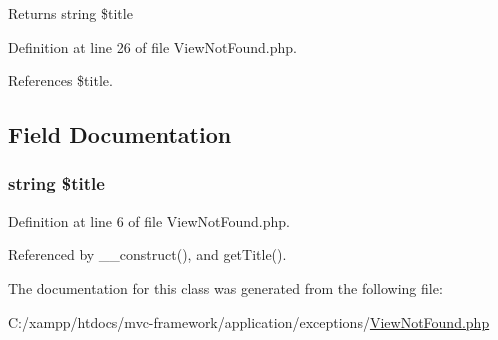 \begin{DoxyReturn}{Returns}
string \$title 
\end{DoxyReturn}


Definition at line 26 of file View\+Not\+Found.\+php.



References \$title.




\subsection{Field Documentation}
\hypertarget{class_view_not_found_a5ef02115477cfad473df2455da5a908e}{}
\subsubsection[{\$title}]{\setlength{\rightskip}{0pt plus 5cm}string \$title\hspace{0.3cm}{\ttfamily [protected]}}\label{class_view_not_found_a5ef02115477cfad473df2455da5a908e}


Definition at line 6 of file View\+Not\+Found.\+php.



Referenced by \+\_\+\+\_\+construct(), and get\+Title().



The documentation for this class was generated from the following file\+:\begin{DoxyCompactItemize}
\item 
C\+:/xampp/htdocs/mvc-\/framework/application/exceptions/\hyperlink{_view_not_found_8php}{View\+Not\+Found.\+php}\end{DoxyCompactItemize}
